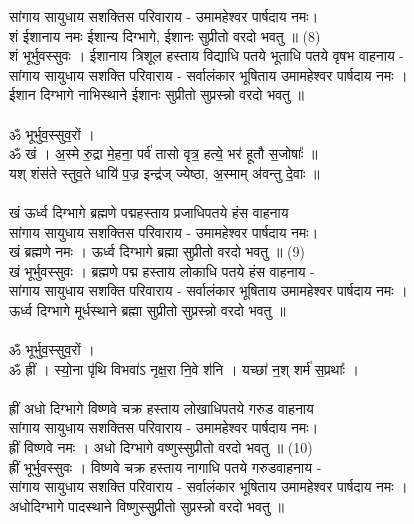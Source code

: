 सांगाय सायुधाय सशक्तिस परिवाराय -  उमामहेश्वर पार्षदाय नमः।\\
शं ईशानाय नमः  ईशान्य दिग्भागे, ईशानः सुप्रीतो  वरदो भवतु ॥ (8)\\
{\small शं भूर्भुवस्सुवः । ईशानाय त्रिशूल हस्ताय विद्याधि पतये भूताधि पतये वृषभ वाहनाय -\\
सांगाय सायुधाय सशक्ति परिवाराय - सर्वालंकार भूषिताय उमामहेश्वर पार्षदाय नमः ।\\
ईशान दिग्भागे नाभिस्थाने ईशानः सुप्रीतो सुप्रस्न्नो वरदो भवतु ॥}\\
\\
ॐ भूर्भुव॒स्सुव॒रों ।\\
{\small ॐ} खं । अ॒स्मे रु॒द्रा मे॒हना॒ पर्व॑ तासो वृत्र॒ हत्ये॒ भर॑ हूतौ स॒जोषाः᳚ ॥\\
यश् शंस॑ते स्तुव॒ते धायि॑ प॒ज्र इन्द्र॑ज् ज्येष्ठा, अ॒स्माम् अ॑वन्तु दे॒वाः ॥\\
\\
खं ऊर्ध्व दिग्भागे ब्रह्मणे पद्महस्ताय प्रजाधिपतये हंस वाहनाय\\
सांगाय सायुधाय सशक्तिस परिवाराय -  उमामहेश्वर पार्षदाय नमः।\\
खं ब्रह्मणे नमः । ऊर्ध्व दिग्भागे ब्रह्मा सुप्रीतो  वरदो भवतु ॥  (9)\\
{\small खं भूर्भुवस्सुवः । ब्रह्मणे पद्म हस्ताय लोकाधि पतये हंस वाहनाय -\\
सांगाय सायुधाय सशक्ति परिवाराय - सर्वालंकार भूषिताय उमामहेश्वर पार्षदाय नमः ।\\
ऊर्ध्व दिग्भागे मूर्धस्थाने ब्रह्मा सुप्रीतो सुप्रस्न्नो वरदो भवतु ॥}\\
\\
ॐ भूर्भुव॒स्सुव॒रों ।\\
{\small ॐ} ह्रीं । स्यो॒ना पृ॑थि विभवा॑ऽ नृक्ष॒रा नि॒वे श॑नि । यच्छा॑ न॒श् शर्म॑ स॒प्रथाः᳚ ।\\
\\
ह्रीं अधो दिग्भागे विष्णवे चक्र हस्ताय लोखाधिपतये गरुड वाहनाय\\
सांगाय सायुधाय सशक्तिस परिवाराय -  उमामहेश्वर पार्षदाय नमः।\\
ह्रीं विष्णवे नमः । अधो दिग्भागे वष्णुस्सुप्रीतो वरदो भवतु ॥  (10)\\
{\small ह्रीं भूर्भुवस्सुवः । विष्णवे चक्र हस्ताय नागाधि पतये गरुडवाहनाय -\\
सांगाय सायुधाय सशक्ति परिवाराय - सर्वालंकार भूषिताय उमामहेश्वर पार्षदाय नमः ।\\
अधोदिग्भागे पादस्थाने विष्णुस्सुुप्रीतो सुप्रस्न्नो वरदो भवतु ॥}\\
